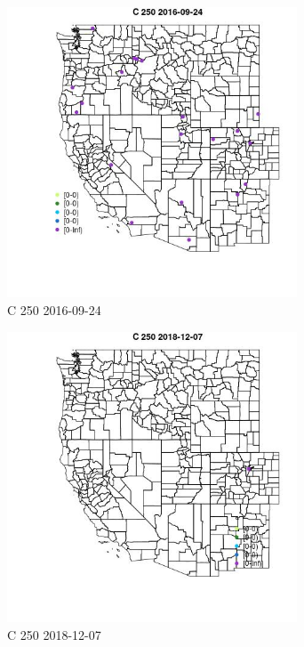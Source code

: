 \begin{figure} 
\centering  
\includegraphics[width=0.77\textwidth]{Code_Outputs/Report_ML_input_PM25_Step4_part_e_de_duplicated_aves_MapObsC_2502016-09-24.jpg} 
\caption{\label{fig:Report_ML_input_PM25_Step4_part_e_de_duplicated_avesMapObsC_2502016-09-24}C 250 2016-09-24} 
\end{figure} 
 

\begin{figure} 
\centering  
\includegraphics[width=0.77\textwidth]{Code_Outputs/Report_ML_input_PM25_Step4_part_e_de_duplicated_aves_MapObsC_2502018-12-07.jpg} 
\caption{\label{fig:Report_ML_input_PM25_Step4_part_e_de_duplicated_avesMapObsC_2502018-12-07}C 250 2018-12-07} 
\end{figure} 
 

